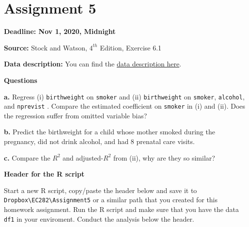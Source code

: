 \documentclass[
]{book}
\begin{document}
\hypertarget{assignment-5}{%
\section{Assignment 5}\label{assignment-5}}

\textbf{Deadline: Nov 1, 2020, Midnight}

\textbf{Source:} Stock and Watson, \(4^{th}\) Edition, Exercise 6.1

\textbf{Data description:} You can find the \href{https://www.dropbox.com/s/s0q564v6lplbexu/Birthweight_Smoking_Description.pdf?dl=1}{data description here}.

\textbf{Questions}

\textbf{a.} Regress (i) \texttt{birthweight} on \texttt{smoker} and (ii) \texttt{birthweight} on \texttt{smoker}, \texttt{alcohol}, and \texttt{nprevist} . Compare the estimated coefficient on \texttt{smoker} in (i) and (ii). Does the regression suffer from omitted variable bias?

\textbf{b.} Predict the birthweight for a child whose mother smoked during the pregnancy, did not drink alcohol, and had 8 prenatal care visits.

\textbf{c.} Compare the \(R^2\) and adjusted-\(R^2\) from (ii), why are they so similar?

\textbf{Header for the R script}

Start a new R script, copy/paste the header below and save it to \texttt{Dropbox\textbackslash{}EC282\textbackslash{}Assignment5} or a similar path that you created for this homework assignment. Run the R script and make sure that you have the data \texttt{df1} in your enviroment. Conduct the analysis below the header.
\end{document}
